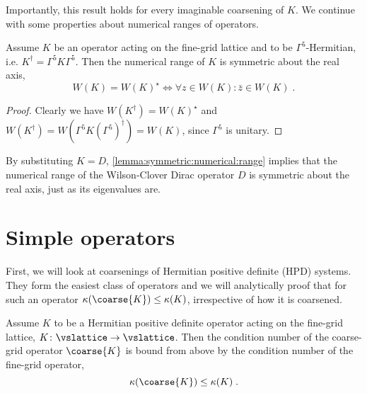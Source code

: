 Importantly, this result holds for every imaginable coarsening of $K$.
We continue with some properties about numerical ranges of operators.

\begin{lemma}[] \label{lemma:symmetric:numerical:range}
Assume $K$ be an operator acting on the fine-grid lattice and to be $\Gamma^{5}$-Hermitian, i.e. $K^{\dagger} = \Gamma^{5} K \Gamma^{5}$.
Then the numerical range of $K$ is symmetric about the real axis,
\begin{equation}
W(K) = W(K)^{\star} \iff \forall z \in W(K) \colon \bar{z} \in W(K) \;.
\end{equation}
\end{lemma}

\begin{proof}
Clearly we have $W(K^{\dagger}) = W(K)^{\star}$ and $W(K^{\dagger}) = W(\Gamma^{5} K (\Gamma^{5})^{\dagger}) = W(K)$, since $\Gamma^{5}$ is unitary.
\end{proof}

By substituting $K=D$, \cref{lemma:symmetric:numerical:range} implies that the numerical range of the Wilson-Clover Dirac operator $D$ is symmetric about the real axis, just as its eigenvalues are.

\section{Simple operators}

First, we will look at coarsenings of Hermitian positive definite (HPD) systems.
They form the easiest class of operators and we will analytically proof that for such an operator $\kappa(\coarse{K}) \leq \kappa(K)$, irrespective of how it is coarsened.

\begin{theorem} \label{thm:cond:hpd}
Assume $K$ to be a Hermitian positive definite operator acting on the fine-grid lattice, $K \colon \vslattice \rightarrow \vslattice$. Then the condition number of the coarse-grid operator $\coarse{K}$ is bound from above by the condition number of the fine-grid operator,
\begin{equation}
\kappa(\coarse{K}) \leq \kappa(K) \;.
\end{equation}
\end{theorem}

